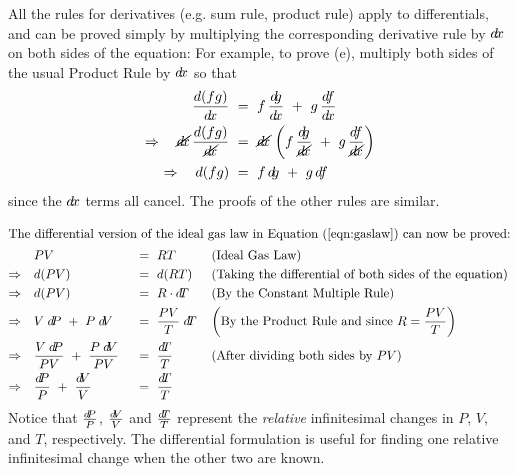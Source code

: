 All the rules for derivatives (e.g. sum rule, product rule) apply to
differentials, and can be proved simply by multiplying the corresponding
derivative rule by $d\!x$ on both sides of the equation:
\newpage
{}
For example, to prove (e), multiply both sides of the usual Product Rule by
$d\!x$ so that
\begin{align*}
  \frac{d(fg)}{\dx} ~&=~ f\,\frac{\dg}{\dx} ~+~ g\,\frac{\df}{\dx}\\
  \Rightarrow\quad\cancel{\dx}\,\frac{d(fg)}{\cancel{\dx}} ~&=~
  \cancel{\dx}\,\left(f\,\frac{\dg}{\cancel{\dx}} ~+~
  g\,\frac{\df}{\cancel{\dx}}\right)\\
  \Rightarrow\quad d(fg) ~&=~ f\,\dg ~+~ g\,\df \quad\checkmark
\end{align*}
since the $d\!x$ terms all cancel. The proofs of the other rules are similar.

\begin{align*}
 \intertext{The differential version of the ideal gas law in Equation (\ref{eqn:gaslaw}) can now be proved:}
 &PV& ~&=~ RT& &\left(\text{Ideal Gas Law}\right)\\
\Rightarrow\quad &d(PV)& ~&=~ d(RT)& &\left(\text{Taking the differential of both sides of the equation}\right)\\
\Rightarrow\quad &d(PV)& ~&=~ R \cdot \dT& &\left(\text{By the Constant Multiple Rule}\right)\\
\Rightarrow\quad &V \; \dP ~+~ P \; \dV& ~&=~ \frac{PV}{T} \; \dT& &\left(\text{By the Product Rule and since
 $R = \frac{PV}{T}$}\right)\\
\Rightarrow\quad &\frac{V\;\dP}{PV} ~+~ \frac{P\;\dV}{PV}& ~&=~ \frac{\dT}{T}& &\left(\text{After dividing both
 sides by $PV$}\right)\\
\Rightarrow\quad &\frac{\dP}{P} ~+~ \frac{\dV}{V}& ~&=~ \frac{\dT}{T}& &\checkmark
\end{align*}
Notice that $\frac{d\negmedspace P}{P}$, $\frac{d\negmedspace V}{V}$ and $\frac{d\negmedspace T}{T}$ represent
the \emph{relative} infinitesimal changes in $P$, $V$, and $T$, respectively.
The differential formulation is useful for finding one relative infinitesimal
change when the other two are known.

